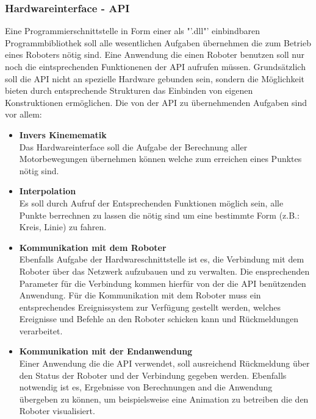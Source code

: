 \subsubsection{Hardwareinterface - API}
Eine Programmierschnittstelle in Form einer als "'.dll"' einbindbaren Programmbibliothek soll alle wesentlichen Aufgaben übernehmen die zum Betrieb eines Roboters nötig sind. Eine Anwendung die einen Roboter benutzen soll nur noch die eintsprechenden Funktionenen der API aufrufen müssen. Grundsätzlich soll die API nicht an spezielle Hardware gebunden sein, sondern die Möglichkeit bieten durch entsprechende Strukturen das Einbinden von eigenen Konstruktionen ermöglichen. 
Die von der API zu übernehmenden Aufgaben sind vor allem:
\begin{itemize}
\item \textbf{Invers Kinemematik}\\
Das Hardwareinterface soll die Aufgabe der Berechnung aller Motorbewegungen übernehmen können welche zum erreichen eines Punktes nötig sind.
\newpage
\item \textbf{Interpolation}\\
Es soll durch Aufruf der Entsprechenden Funktionen möglich sein, alle Punkte berrechnen zu lassen die nötig sind um eine bestimmte Form (z.B.: Kreis, Linie) zu fahren.
\item \textbf{Kommunikation mit dem Roboter}\\
Ebenfalls Aufgabe der Hardwareschnittstelle ist es, die Verbindung mit dem Roboter über das Netzwerk aufzubauen und zu verwalten. Die ensprechenden Parameter für die Verbindung kommen hierfür von der die API benützenden Anwendung. Für die Kommunikation mit dem Roboter muss ein entsprechendes Ereignissystem zur Verfügung gestellt werden, welches Ereignisse und Befehle an den Roboter schicken kann und Rückmeldungen verarbeitet.
\item \textbf{Kommunikation mit der Endanwendung}\\
Einer Anwendung die die API verwendet, soll ausreichend Rückmeldung über den Status der Roboter und der Verbindung gegeben werden. Ebenfalls notwendig ist es, Ergebnisse von Berechnungen and die Anwendung übergeben zu können, um beispielsweise eine Animation zu betreiben die den Roboter visualisiert.
\end{itemize}
